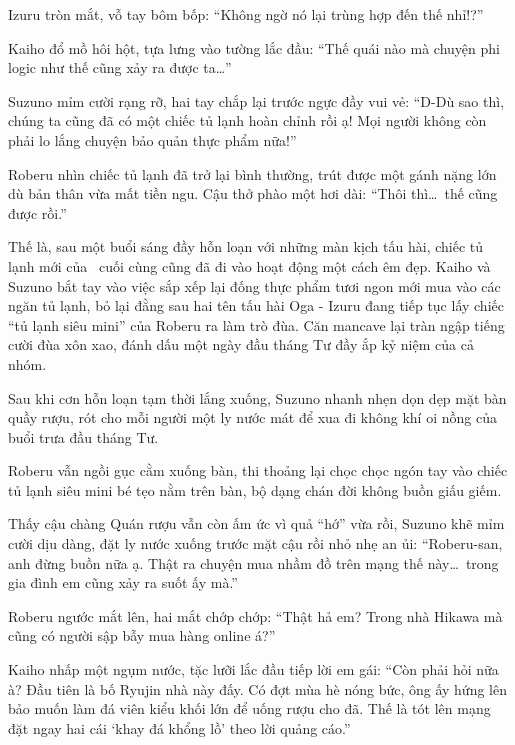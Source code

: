 \documentclass[../main.tex]{subfiles}
\begin{document}
Izuru tròn mắt, vỗ tay bôm bốp: ``Không ngờ nó lại trùng hợp đến thế nhỉ!?''

Kaiho đổ mồ hôi hột, tựa lưng vào tường lắc đầu: ``Thế quái nào mà chuyện phi logic như thế cũng xảy ra được ta\dots''

Suzuno mỉm cười rạng rỡ, hai tay chắp lại trước ngực đầy vui vẻ: ``D-Dù sao thì, chúng ta cũng đã có một chiếc tủ lạnh hoàn chỉnh rồi ạ! Mọi người không còn phải lo lắng chuyện bảo quản thực phẩm nữa!''

Roberu nhìn chiếc tủ lạnh đã trở lại bình thường, trút được một gánh nặng lớn dù bản thân vừa mất tiền ngu. Cậu thở phào một hơi dài: ``Thôi thì\dots\ thế cũng được rồi.''

Thế là, sau một buổi sáng đầy hỗn loạn với những màn kịch tấu hài, chiếc tủ lạnh mới của \hls\ cuối cùng cũng đã đi vào hoạt động một cách êm đẹp. Kaiho và Suzuno bắt tay vào việc sắp xếp lại đống thực phẩm tươi ngon mới mua vào các ngăn tủ lạnh, bỏ lại đằng sau hai tên tấu hài Oga - Izuru đang tiếp tục lấy chiếc ``tủ lạnh siêu mini'' của Roberu ra làm trò đùa. Căn mancave lại tràn ngập tiếng cười đùa xôn xao, đánh dấu một ngày đầu tháng Tư đầy ắp kỷ niệm của cả nhóm.

\omk

Sau khi cơn hỗn loạn tạm thời lắng xuống, Suzuno nhanh nhẹn dọn dẹp mặt bàn quầy rượu, rót cho mỗi người một ly nước mát để xua đi không khí oi nồng của buổi trưa đầu tháng Tư.

Roberu vẫn ngồi gục cằm xuống bàn, thi thoảng lại chọc chọc ngón tay vào chiếc tủ lạnh siêu mini bé tẹo nằm trên bàn, bộ dạng chán đời không buồn giấu giếm.

Thấy cậu chàng Quán rượu vẫn còn ấm ức vì quả ``hớ'' vừa rồi, Suzuno khẽ mỉm cười dịu dàng, đặt ly nước xuống trước mặt cậu rồi nhỏ nhẹ an ủi: ``Roberu-san, anh đừng buồn nữa ạ. Thật ra chuyện mua nhầm đồ trên mạng thế này\dots\ trong gia đình em cũng xảy ra suốt ấy mà.''

Roberu ngước mắt lên, hai mắt chớp chớp: ``Thật hả em? Trong nhà Hikawa mà cũng có người sập bẫy mua hàng online á?''

Kaiho nhấp một ngụm nước, tặc lưỡi lắc đầu tiếp lời em gái: ``Còn phải hỏi nữa à? Đầu tiên là bố Ryujin nhà này đấy. Có đợt mùa hè nóng bức, ông ấy hứng lên bảo muốn làm đá viên kiểu khối lớn để uống rượu cho đã. Thế là tót lên mạng đặt ngay hai cái `khay đá khổng lồ' theo lời quảng cáo.''
\end{document}

